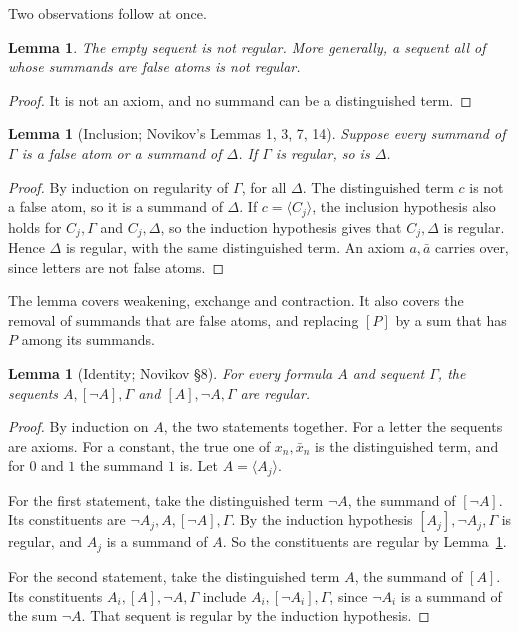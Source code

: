 \documentclass[11pt]{amsart}
\newtheorem{lemma}[theorem]{Lemma}
\theoremstyle{definition}
\theoremstyle{remark}
\newcommand{\seq}[1]{\langle #1\rangle}
\newcommand{\one}[1]{[#1]}
\newcommand{\nx}{\bar x}
\begin{document}
Two observations follow at once.

\begin{lemma}\label{lem:empty}
  The empty sequent is not regular. More generally, a sequent all of whose
  summands are false atoms is not regular.
\end{lemma}

\begin{proof}
  It is not an axiom, and no summand can be a distinguished term.
\end{proof}

\begin{lemma}[Inclusion; Novikov's Lemmas 1, 3, 7, 14]\label{lem:incl}
  Suppose every summand of $\Gamma$ is a false atom or a summand of $\Delta$. If
  $\Gamma$ is regular, so is $\Delta$.
\end{lemma}

\begin{proof}
  By induction on regularity of $\Gamma$, for all $\Delta$. The
  distinguished term $c$ is not a false atom, so it is a summand of $\Delta$. If
  $c=\seq{C_j}$, the inclusion hypothesis also holds for $C_j,\Gamma$ and
  $C_j,\Delta$, so the induction hypothesis gives that $C_j,\Delta$ is
  regular. Hence $\Delta$ is regular, with the same distinguished term.
  An axiom $a,\bar a$ carries over, since letters are not false atoms.
\end{proof}

The lemma covers weakening, exchange and contraction. It also covers the
removal of summands that are false atoms, and replacing $\one{P}$ by a sum that has $P$
among its summands.

\begin{lemma}[Identity; Novikov \S8]\label{lem:id}
  For every formula $A$ and sequent $\Gamma$, the sequents
  $A,\one{\neg A},\Gamma$ and $\one{A},\neg A,\Gamma$ are regular.
\end{lemma}

\begin{proof}
  By induction on $A$, the two statements together. For a letter the
  sequents are axioms. For a constant, the true one of $x_n,\nx_n$ is the
  distinguished term, and for $0$ and $1$ the summand $1$ is. Let
  $A=\seq{A_j}$.

  For the first statement, take the distinguished term $\neg A$, the
  summand of $\one{\neg A}$. Its constituents are
  $\neg A_j,A,\one{\neg A},\Gamma$. By the induction hypothesis
  $\one{A_j},\neg A_j,\Gamma$ is regular, and $A_j$ is a summand of $A$.
  So the constituents are regular by Lemma~\ref{lem:incl}.

  For the second statement, take the distinguished term $A$, the summand
  of $\one{A}$. Its constituents $A_i,\one{A},\neg A,\Gamma$ include
  $A_i,\one{\neg A_i},\Gamma$, since $\neg A_i$ is a summand of the sum
  $\neg A$. That sequent is regular by the induction hypothesis.
\end{proof}
\end{document}
